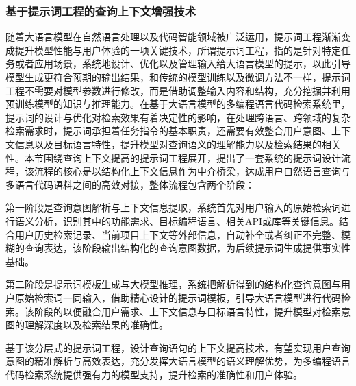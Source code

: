 \documentclass[UTF8,a4paper,12pt]{ctexart}
\numberwithin{equation}{section}
\begin{document}
\subsubsection{基于提示词工程的查询上下文增强技术}
随着大语言模型在自然语言处理以及代码智能领域被广泛运用，提示词工程渐渐变成提升模型性能与用户体验的一项关键技术，所谓提示词工程，指的是针对特定任务或者应用场景，系统地设计、优化以及管理输入给大语言模型的提示，以此引导模型生成更符合预期的输出结果，和传统的模型训练以及微调方法不一样，提示词工程不需要对模型参数进行修改，而是借助调整输入内容和结构，充分挖掘并利用预训练模型的知识与推理能力。在基于大语言模型的多编程语言代码检索系统里，提示词的设计与优化对检索效果有着决定性的影响，在处理跨语言、跨领域的复杂检索需求时，提示词承担着任务指令的基本职责，还需要有效整合用户意图、上下文信息以及目标语言特性，提升模型对查询语义的理解能力以及检索结果的相关性。本节围绕查询上下文提高的提示词工程展开，提出了一套系统的提示词设计流程，该流程的核心是以结构化上下文信息作为中介桥梁，达成用户自然语言查询与多语言代码语料之间的高效对接，整体流程包含两个阶段：\par
第一阶段是查询意图解析与上下文信息提取，系统首先对用户输入的原始检索词进行语义分析，识别其中的功能需求、目标编程语言、相关API或库等关键信息。结合用户历史检索记录、当前项目上下文等外部信息，自动补全或者纠正不完整、模糊的查询表达，该阶段输出结构化的查询意图数据，为后续提示词生成提供事实性基础。\par
第二阶段是提示词模板生成与大模型推理，系统把解析得到的结构化查询意图与用户原始检索词一同输入，借助精心设计的提示词模板，引导大语言模型进行代码检索。该阶段的以便融合用户需求、上下文信息与目标语言特性，提升模型对检索意图的理解深度以及检索结果的准确性。\par
基于该分层式的提示词工程，设计查询语句的上下文提高技术，有望实现用户查询意图的精准解析与高效表达，充分发挥大语言模型的语义理解优势，为多编程语言代码检索系统提供强有力的模型支持，提升检索的准确性和用户体验。\par
\end{document}
